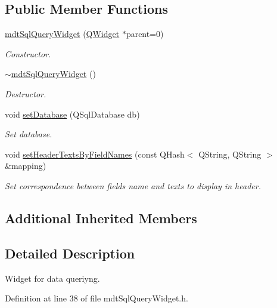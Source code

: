 \subsection*{Public Member Functions}
\begin{DoxyCompactItemize}
\item 
\hyperlink{classmdt_sql_query_widget_a164c6ea31fd4499109c6422f7a8f2bdf}{mdt\-Sql\-Query\-Widget} (\hyperlink{class_q_widget}{Q\-Widget} $\ast$parent=0)
\begin{DoxyCompactList}\small\item\em Constructor. \end{DoxyCompactList}\item 
\hyperlink{classmdt_sql_query_widget_a03a4c8f444655f35d91b1a1b58a13b85}{$\sim$mdt\-Sql\-Query\-Widget} ()
\begin{DoxyCompactList}\small\item\em Destructor. \end{DoxyCompactList}\item 
void \hyperlink{classmdt_sql_query_widget_a69de231c33149a9f01df0215a91cf0bd}{set\-Database} (Q\-Sql\-Database db)
\begin{DoxyCompactList}\small\item\em Set database. \end{DoxyCompactList}\item 
void \hyperlink{classmdt_sql_query_widget_a8ca0e1fbf8be78fe178ee1f2fc15522c}{set\-Header\-Texts\-By\-Field\-Names} (const Q\-Hash$<$ Q\-String, Q\-String $>$ \&mapping)
\begin{DoxyCompactList}\small\item\em Set correspondence between fields name and texts to display in header. \end{DoxyCompactList}\end{DoxyCompactItemize}
\subsection*{Additional Inherited Members}


\subsection{Detailed Description}
Widget for data queriyng. 

Definition at line 38 of file mdt\-Sql\-Query\-Widget.\-h.



